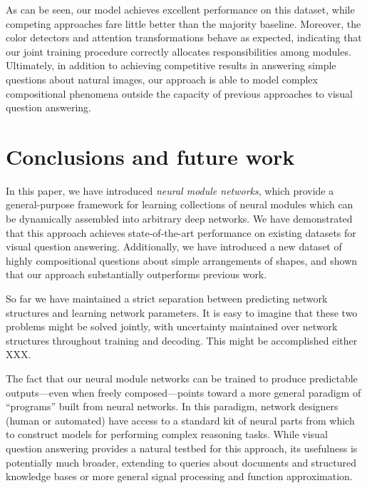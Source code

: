 \documentclass[10pt,twocolumn,letterpaper]{article}
\begin{document}
As can be seen, our model achieves excellent performance on this dataset, while
competing approaches fare little better than the majority baseline. Moreover,
the color detectors and attention transformations behave as expected, indicating
that our joint training procedure correctly allocates responsibilities among
modules. Ultimately, in addition to achieving competitive results in answering
simple questions about natural images, our approach is able to model complex
compositional phenomena outside the capacity of previous approaches to visual
question answering.

\section{Conclusions and future work}

In this paper, we have introduced \emph{neural module networks}, which provide a
general-purpose framework for learning collections of neural modules which can
be dynamically assembled into arbitrary deep networks. We have demonstrated that
this approach achieves state-of-the-art performance on existing datasets for
visual question answering. Additionally, we have introduced a new dataset of
highly compositional questions about simple arrangements of shapes, and shown
that our approach substantially outperforms previous work.

So far we have maintained a strict separation between predicting network
structures and learning network parameters. It is easy to imagine that these two
problems might be solved jointly, with uncertainty maintained over network
structures throughout training and decoding. This might be accomplished either
XXX.

The fact that our neural module networks can be trained to produce predictable
outputs---even when freely composed---points toward a more general paradigm of
``programs'' built from neural networks. In this paradigm, network designers
(human or automated) have access to a standard kit of neural parts from which to
construct models for performing complex reasoning tasks. While visual question
answering provides a natural testbed for this approach, its usefulness is
potentially much broader, extending to queries about documents and structured
knowledge bases or more general signal processing and function approximation.

\small


\end{document}

